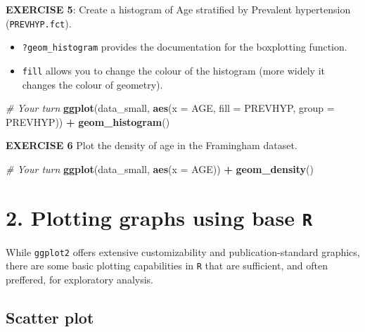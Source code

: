 \documentclass[
]{article}
\newenvironment{Shaded}{\begin{snugshade}}{\end{snugshade}}
\newcommand{\CommentTok}[1]{\textcolor[rgb]{0.56,0.35,0.01}{\textit{#1}}}
\newcommand{\DataTypeTok}[1]{\textcolor[rgb]{0.13,0.29,0.53}{#1}}
\newcommand{\KeywordTok}[1]{\textcolor[rgb]{0.13,0.29,0.53}{\textbf{#1}}}
\newcommand{\NormalTok}[1]{#1}
\newcommand{\OperatorTok}[1]{\textcolor[rgb]{0.81,0.36,0.00}{\textbf{#1}}}
\newcommand{\StringTok}[1]{\textcolor[rgb]{0.31,0.60,0.02}{#1}}
\begin{document}
\textbf{EXERCISE 5}: Create a histogram of Age stratified by Prevalent
hypertension (\texttt{PREVHYP.fct}).

\begin{itemize}
\item
  \texttt{?geom\_histogram} provides the documentation for the
  boxplotting function.
\item
  \texttt{fill} allows you to change the colour of the histogram (more
  widely it changes the colour of geometry).
\end{itemize}

\begin{Shaded}
\begin{Highlighting}[]
\CommentTok{# Your turn}
\KeywordTok{ggplot}\NormalTok{(data_small, }\KeywordTok{aes}\NormalTok{(}\DataTypeTok{x =}\NormalTok{ AGE, }\DataTypeTok{fill =}\NormalTok{ PREVHYP, }\DataTypeTok{group =}\NormalTok{ PREVHYP)) }\OperatorTok{+}\StringTok{ }
\StringTok{  }\KeywordTok{geom_histogram}\NormalTok{()}
\end{Highlighting}
\end{Shaded}

\textbf{EXERCISE 6} Plot the density of age in the Framingham dataset.

\begin{Shaded}
\begin{Highlighting}[]
\CommentTok{# Your turn}
\KeywordTok{ggplot}\NormalTok{(data_small, }\KeywordTok{aes}\NormalTok{(}\DataTypeTok{x =}\NormalTok{ AGE)) }\OperatorTok{+}\StringTok{ }\KeywordTok{geom_density}\NormalTok{()}
\end{Highlighting}
\end{Shaded}

\hypertarget{plotting-graphs-using-base-r}{%
\section{\texorpdfstring{2. Plotting graphs using base
\texttt{R}}{2. Plotting graphs using base R}}\label{plotting-graphs-using-base-r}}

While \texttt{ggplot2} offers extensive customizability and
publication-standard graphics, there are some basic plotting
capabilities in \texttt{R} that are sufficient, and often preffered, for
exploratory analysis.

\hypertarget{scatter-plot}{%
\subsection{Scatter plot}\label{scatter-plot}}
\end{document}
